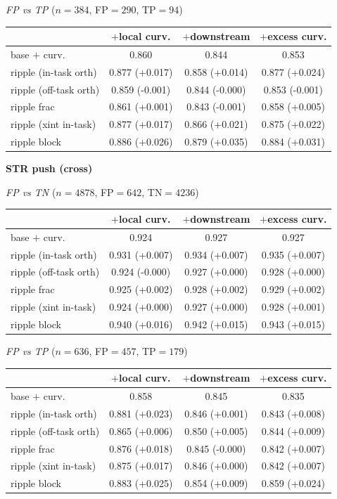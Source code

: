 \begin{table}[t]
\smallskip
\textit{FP vs TP} ($n=384$, FP$=290$, TP$=94$)

\begin{tabular}{l c c c}
\toprule
 & $+$local curv. & $+$downstream & $+$excess curv. \\
\midrule
base $+$ curv. & 0.860 & 0.844 & 0.853 \\
\midrule
ripple (in-task orth) & 0.877 (+0.017) & 0.858 (+0.014) & 0.877 (+0.024) \\
ripple (off-task orth) & 0.859 (-0.001) & 0.844 (-0.000) & 0.853 (-0.001) \\
ripple frac & 0.861 (+0.001) & 0.843 (-0.001) & 0.858 (+0.005) \\
ripple (xint in-task) & 0.877 (+0.017) & 0.866 (+0.021) & 0.875 (+0.022) \\
ripple block & 0.886 (+0.026) & 0.879 (+0.035) & 0.884 (+0.031) \\
\bottomrule
\end{tabular}

\medskip
\textbf{STR push (cross)}


\smallskip
\textit{FP vs TN} ($n=4878$, FP$=642$, TN$=4236$)

\begin{tabular}{l c c c}
\toprule
 & $+$local curv. & $+$downstream & $+$excess curv. \\
\midrule
base $+$ curv. & 0.924 & 0.927 & 0.927 \\
\midrule
ripple (in-task orth) & 0.931 (+0.007) & 0.934 (+0.007) & 0.935 (+0.007) \\
ripple (off-task orth) & 0.924 (-0.000) & 0.927 (+0.000) & 0.928 (+0.000) \\
ripple frac & 0.925 (+0.002) & 0.928 (+0.002) & 0.929 (+0.002) \\
ripple (xint in-task) & 0.924 (+0.000) & 0.927 (+0.000) & 0.928 (+0.001) \\
ripple block & 0.940 (+0.016) & 0.942 (+0.015) & 0.943 (+0.015) \\
\bottomrule
\end{tabular}

\smallskip
\textit{FP vs TP} ($n=636$, FP$=457$, TP$=179$)

\begin{tabular}{l c c c}
\toprule
 & $+$local curv. & $+$downstream & $+$excess curv. \\
\midrule
base $+$ curv. & 0.858 & 0.845 & 0.835 \\
\midrule
ripple (in-task orth) & 0.881 (+0.023) & 0.846 (+0.001) & 0.843 (+0.008) \\
ripple (off-task orth) & 0.865 (+0.006) & 0.850 (+0.005) & 0.844 (+0.009) \\
ripple frac & 0.876 (+0.018) & 0.845 (-0.000) & 0.842 (+0.007) \\
ripple (xint in-task) & 0.875 (+0.017) & 0.846 (+0.000) & 0.842 (+0.007) \\
ripple block & 0.883 (+0.025) & 0.854 (+0.009) & 0.859 (+0.024) \\
\bottomrule
\end{tabular}


\end{table}
